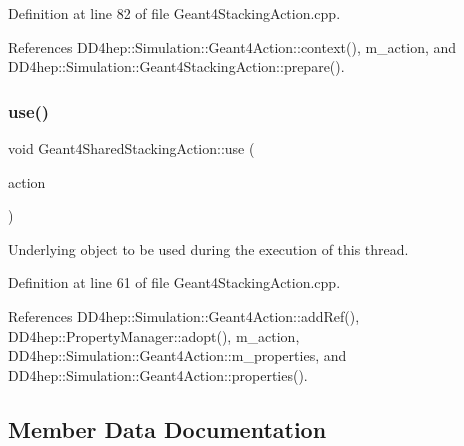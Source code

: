 Definition at line 82 of file Geant4\+Stacking\+Action.\+cpp.



References D\+D4hep\+::\+Simulation\+::\+Geant4\+Action\+::context(), m\+\_\+action, and D\+D4hep\+::\+Simulation\+::\+Geant4\+Stacking\+Action\+::prepare().

\hypertarget{class_d_d4hep_1_1_simulation_1_1_geant4_shared_stacking_action_a8201cb5679ace2713e6a34ebe1282dbf}{}\label{class_d_d4hep_1_1_simulation_1_1_geant4_shared_stacking_action_a8201cb5679ace2713e6a34ebe1282dbf} 
\subsubsection{\texorpdfstring{use()}{use()}}
{\footnotesize\ttfamily void Geant4\+Shared\+Stacking\+Action\+::use (\begin{DoxyParamCaption}\item[{\hyperlink{class_d_d4hep_1_1_simulation_1_1_geant4_stacking_action}{Geant4\+Stacking\+Action} $\ast$}]{action }\end{DoxyParamCaption})\hspace{0.3cm}{\ttfamily [virtual]}}



Underlying object to be used during the execution of this thread. 



Definition at line 61 of file Geant4\+Stacking\+Action.\+cpp.



References D\+D4hep\+::\+Simulation\+::\+Geant4\+Action\+::add\+Ref(), D\+D4hep\+::\+Property\+Manager\+::adopt(), m\+\_\+action, D\+D4hep\+::\+Simulation\+::\+Geant4\+Action\+::m\+\_\+properties, and D\+D4hep\+::\+Simulation\+::\+Geant4\+Action\+::properties().



\subsection{Member Data Documentation}
\hypertarget{class_d_d4hep_1_1_simulation_1_1_geant4_shared_stacking_action_a3f3be5f46d2ee56467337edf438fc153}{}\label{class_d_d4hep_1_1_simulation_1_1_geant4_shared_stacking_action_a3f3be5f46d2ee56467337edf438fc153} 
